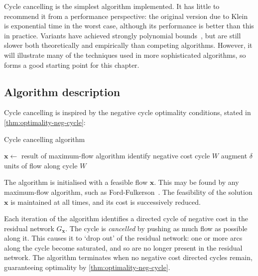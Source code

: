 
Cycle cancelling is the simplest algorithm implemented. It has little to recommend it from a performance perspective: the original version due to Klein~\cite{Klein:1967} is exponential time in the worst case, although its performance is better than this in practice. Variants have achieved strongly polynomial bounds~\cite{Goldberg:1989,Sokkalingam:2000}, but are still slower both theoretically and empirically than competing algorithms. However, it will illustrate many of the techniques used in more sophisticated algorithms, so forms a good starting point for this chapter.

\subsection{Algorithm description}

Cycle cancelling is inspired by the negative cycle optimality conditions, stated in \cref{thm:optimality-neg-cycle}:\\

\optimalitynegcycle*

\begin{algorithm}
    \caption{Cycle cancelling algorithm}
    \label{algo:cycle-cancelling}
    \begin{algorithmic}[1]
        \State $\mathbf{x}\gets $ result of maximum-flow algorithm 
        \State identify negative cost cycle $W$ 
        \State augment $\delta$ units of flow along cycle $W$
        \EndWhile{}
    \end{algorithmic}
\end{algorithm}

The algorithm is initialised with a feasible flow $\mathbf{x}$. This may be found by any maximum-flow algorithm, such as Ford-Fulkerson~\cite{FordFulkerson:1956}. The feasibility of the solution $\mathbf{x}$ is maintained at all times, and its cost is successively reduced. 

Each iteration of the algorithm identifies a directed cycle of negative cost in the residual network $G_\mathbf{x}$. The cycle is \emph{cancelled} by pushing as much flow as possible along it. This causes it to `drop out' of the residual network: one or more arcs along the cycle become saturated, and so are no longer present in the residual network. The algorithm terminates when no negative cost directed cycles remain, guaranteeing optimality by \cref{thm:optimality-neg-cycle}.

